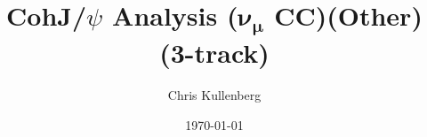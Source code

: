 \title{CohJ/$\psi$ Analysis ($\boldsymbol{\nu_\mu}$ \textbf{CC})(\textbf{Other})(\textbf{3-track})}
\author{Chris Kullenberg}
\date{\today}
